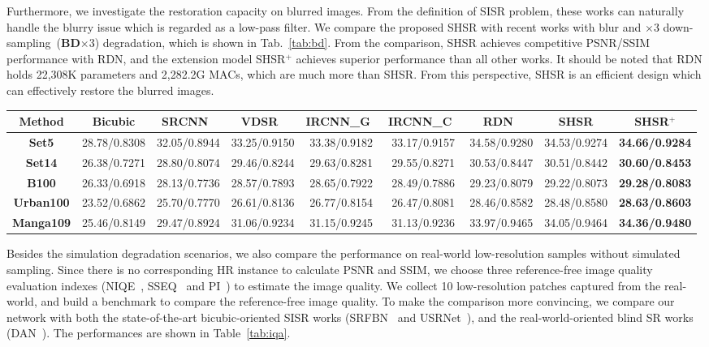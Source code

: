 \documentclass[manuscript,screen]{acmart}
\begin{document}
Furthermore, we investigate the restoration capacity on blurred images. From the definition of SISR problem, these works can naturally handle the blurry issue which is regarded as a low-pass filter. We compare the proposed SHSR with recent works with blur and $\times3$ down-sampling~(\textbf{BD}$\times3$) degradation, which is shown in Tab.~\ref{tab:bd}. From the comparison, SHSR achieves competitive PSNR/SSIM performance with RDN, and the extension model SHSR$^+$ achieves superior performance than all other works. It should be noted that RDN holds 22,308K parameters and 2,282.2G MACs, which are much more than SHSR. From this perspective, SHSR is an efficient design which can effectively restore the blurred images.

\begin{table*}[t]
	\centering
	\caption{PSNR/SSIM results with \textbf{BD}$\times3$ degradation.}
	\label{tab:bd}
	\fontsize{6.5}{8}\selectfont
	\begin{tabular}{|c|c|c|c|c|c|c|c|c|}
		\hline
		\textbf{Method}& Bicubic& SRCNN~\cite{srcnn_pami2016}& VDSR~\cite{vdsr_cvpr2016}& IRCNN\_G~\cite{ircnn_cvpr2017}& IRCNN\_C~\cite{ircnn_cvpr2017}& RDN~\cite{rdn_pami2020}& SHSR& SHSR$^+$\\
		\hline
		\hline
		\textbf{Set5}& 			28.78/0.8308& 32.05/0.8944& 33.25/0.9150& 33.38/0.9182& 33.17/0.9157& 34.58/0.9280& 34.53/0.9274& \textbf{34.66/0.9284}\\
		\textbf{Set14}& 		26.38/0.7271& 28.80/0.8074& 29.46/0.8244& 29.63/0.8281& 29.55/0.8271& 30.53/0.8447& 30.51/0.8442& \textbf{30.60/0.8453}\\
		\textbf{B100}& 			26.33/0.6918& 28.13/0.7736& 28.57/0.7893& 28.65/0.7922& 28.49/0.7886& 29.23/0.8079& 29.22/0.8073& \textbf{29.28/0.8083}\\
		\textbf{Urban100}& 		23.52/0.6862& 25.70/0.7770& 26.61/0.8136& 26.77/0.8154& 26.47/0.8081& 28.46/0.8582& 28.48/0.8580& \textbf{28.63/0.8603}\\
		\textbf{Manga109}& 		25.46/0.8149& 29.47/0.8924& 31.06/0.9234& 31.15/0.9245& 31.13/0.9236& 33.97/0.9465& 34.05/0.9464& \textbf{34.36/0.9480}\\
		\hline
	\end{tabular}
\end{table*}


Besides the simulation degradation scenarios, we also compare the performance on real-world low-resolution samples without simulated sampling. Since there is no corresponding HR instance to calculate PSNR and SSIM, we choose three reference-free image quality evaluation indexes (NIQE~\cite{niqe_spl2013}, SSEQ~\cite{sseq_spic2014} and PI~\cite{esrgan_eccvw2018}) to estimate the image quality. We collect 10 low-resolution patches captured from the real-world, and build a benchmark to compare the reference-free image quality. To make the comparison more convincing, we compare our network with both the state-of-the-art bicubic-oriented SISR works (SRFBN~\cite{srfbn_cvpr2019} and USRNet~\cite{usrnet_cvpr2020}), and the real-world-oriented blind SR works (DAN~\cite{dan_nips2020}). The performances are shown in Table~\ref{tab:iqa}.
\end{document}
